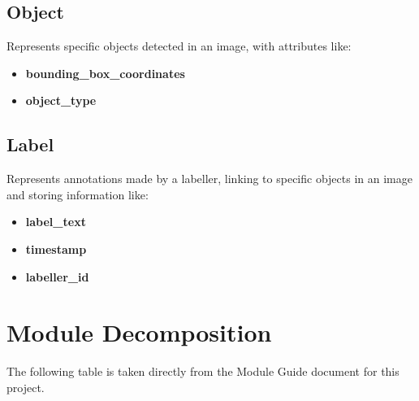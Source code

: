 \documentclass[12pt, titlepage]{article}
\begin{document}
\subsection*{Object}
Represents specific objects detected in an image, with attributes like:
\begin{itemize}
    \item \textbf{bounding\_box\_coordinates}
    \item \textbf{object\_type}
\end{itemize}

\subsection*{Label}
Represents annotations made by a labeller, linking to specific objects in an image and storing information like:
\begin{itemize}
    \item \textbf{label\_text}
    \item \textbf{timestamp}
    \item \textbf{labeller\_id}
\end{itemize}


\section{Module Decomposition}

The following table is taken directly from the Module Guide document for this project.
\end{document}

